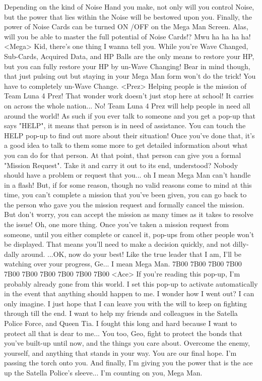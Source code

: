 Depending on the kind of Noise Hand you make, 
not only will you control Noise, 
but the power that lies within the Noise will be bestowed upon you. 
Finally, the power of Noise Cards can be turned 
ON /OFF on the Mega Man Screen. 
Alas, will you be able to master the full potential of Noise Cards!? 
Mwu ha ha ha ha! 
<Mega> Kid, there's one thing I wanna tell you. 
While you're Wave Changed, Sub-Cards, 
Acquired Data, and HP Balls are the only means to restore your HP, 
but you can fully restore your HP by un-Wave Changing! Bear in mind 
though, that just pulsing out but staying in your Mega Man form won't do 
the trick! You have to completely un-Wave Change. 
<Prez> Helping people is the mission of Team Luna 4 Prez! 
That wonder work doesn't just stop here at school! 
It carries on across the whole nation... No! 
Team Luna 4 Prez will help people in need all around the world! 
As such if you ever talk to someone and you get a pop-up that says "HELP", 
it means that person is in need of assistance. 
You can touch the HELP pop-up to find out more about their situation! 
Once you've done that, it's a good idea to talk to them some more to get 
detailed information about what you can do for that person. 
At that point, that person can give you a formal "Mission Request". 
Take it and carry it out to its end, understood? 
Nobody should have a problem or request that 
you... oh I mean Mega Man can't handle in a flash! 
But, if for some reason, though no valid reasons come to mind at this time, 
you can't complete a mission that you've been given, you can go back 
to the person who gave you the mission request 
and formally cancel the mission. 
But don't worry, you can accept the mission as 
many times as it takes to resolve the issue! 
Oh, one more thing. 
Once you've taken a mission request from 
someone, until you either complete or cancel it, 
pop-ups from other people won't be displayed. 
That means you'll need to make a decision quickly, and not dilly-dally around. 
...OK, now do your best! Like the true leader that I am, I'll be watching over 
your progress, Ge... I mean Mega Man. 
{7B}{00} 
{7B}{00} 
{7B}{00} 
{7B}{00} 
{7B}{00} 
{7B}{00} 
{7B}{00} 
{7B}{00} 
{7B}{00} 
{7B}{00} 
<Ace> If you're reading this pop-up, I'm probably 
already gone from this world. 
I set this pop-up to activate automatically in 
the event that anything should happen to me. 
I wonder how I went out? I can only imagine. 
I just hope that I can leave you with the will to 
keep on fighting through till the end. 
I want to help my friends and colleagues in the Satella Police Force, 
and Queen Tia. 
I fought this long and hard because I want to protect all that is dear to me... 
You too, Geo, fight to protect the bonds that you've built-up until now, 
and the things you care about. 
Overcome the enemy, yourself, and anything that stands in your way. 
You are our final hope. I'm passing the torch onto you. 
And finally, I'm giving you the power that is 
the ace up the Satella Police's sleeve... 
I'm counting on you, Mega Man. 
